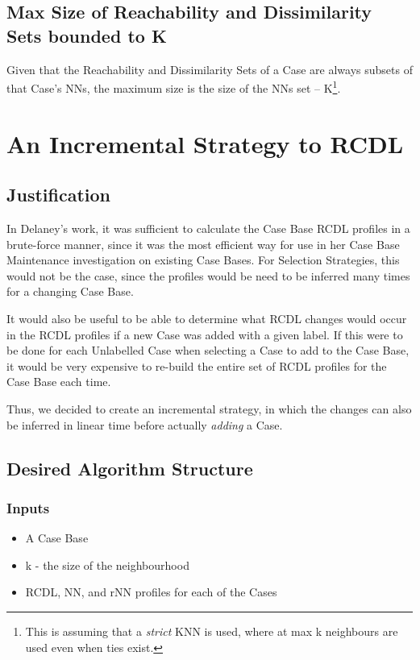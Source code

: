 \documentclass[a4paper,11pt]{report}
\begin{document}
\subsection{Max Size of Reachability and Dissimilarity Sets bounded to K}
Given that the Reachability and Dissimilarity Sets of a Case are always subsets of that Case's NNs, the maximum size is the size of the NNs set – K\footnote{This is assuming that a \emph{strict} KNN is used, where at max k neighbours are used even when ties exist.}.

\section{An Incremental Strategy to RCDL}
\subsection{Justification} 
In Delaney's work, it was sufficient to calculate the Case Base RCDL profiles in a brute-force manner, since it was the most efficient way for use in her Case Base Maintenance investigation on existing Case Bases. For Selection Strategies, this would not be the case, since the profiles would be need to be inferred many times for a changing Case Base.

It would also be useful to be able to determine what RCDL changes would occur in the RCDL profiles if a new Case was added with a given label. If this were to be done for each Unlabelled Case when selecting a Case to add to the Case Base, it would be very expensive to re-build the entire set of RCDL profiles for the Case Base each time.

Thus, we decided to create an incremental strategy, in which the changes can also be inferred in linear time before actually \emph{adding} a Case.

\subsection{Desired Algorithm Structure}
\subsubsection{Inputs}
\begin{itemize}
	\item A Case Base 
	\item k - the size of the neighbourhood
	\item RCDL, NN, and rNN profiles for each of the Cases
\end{itemize}
\end{document}

